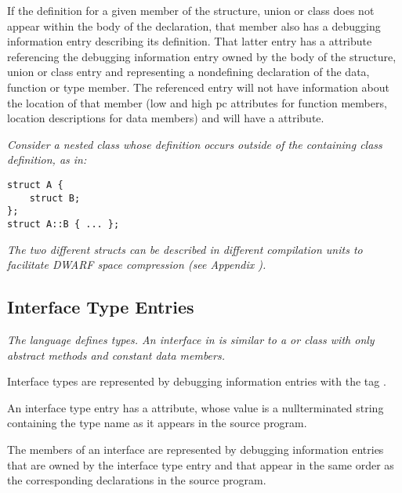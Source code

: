 If the definition for a given member of the structure, union
or class does not appear within the body of the declaration,
that member also has a debugging information entry describing
its definition. That latter entry has a 
 attribute 
referencing the debugging information entry
owned by the body of the structure, union or class entry and
representing a non\dash defining declaration of the data, function
or type member. The referenced entry will not have information
about the location of that member (low and high pc attributes
for function members, location descriptions for data members)
and will have a  attribute.

\textit{Consider a nested class whose 
definition occurs outside of the containing class definition, as in:}

\begin{lstlisting}[numbers=none]
struct A {
    struct B;
};
struct A::B { ... };
\end{lstlisting}

\textit{The two different structs can be described in 
different compilation units to 
facilitate DWARF space compression 
(see Appendix ).}

\subsection{Interface Type Entries}
\label{chap:interfacetypeentries}

\textit{The  language defines  types. 
An interface
in  is similar to a  or 
 class with only abstract
methods and constant data members.}

Interface types 
are represented by debugging information
entries with the 
tag .

An interface type entry has 
a  attribute,
whose
value is a null\dash terminated string containing the type name
as it appears in the source program.

The members of an interface are represented by debugging
information entries that are owned by the interface type
entry and that appear in the same order as the corresponding
declarations in the source program.


